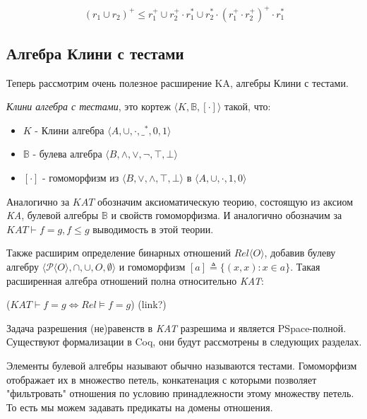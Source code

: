 \documentclass[times
              ]{itmo-student-thesis}
\begin{document}
      $$ (r_1 \cup r_2)^+ \leq r_1^+ \cup r_2^+ \cdot r_1^* \cup r_2^* \cdot (r_1^+ \cdot r_2^+)^+ \cdot r_1^* $$

    \subsection{Алгебра Клини с тестами}
      Теперь рассмотрим очень полезное расширение KA, алгебры Клини с тестами.

      \textit{Клини алгебра с тестами}, это кортеж $\langle K,\mathbb{B}, [\cdot] \rangle$ такой, что:

      \begin{itemize}
        \item $K$ - Клини алгебра $\langle A, \cup, \cdot, \_^*, 0, 1 \rangle $
        \item $\mathbb{B}$ - булева алгебра $\langle B, \wedge, \vee, \neg, \top, \bot \rangle $
        \item $[\cdot]$ - гомоморфизм из
          $\langle B, \vee, \wedge, \top, \bot \rangle$
        в $\langle A, \cup,     \cdot, 1,    0 \rangle$
      \end{itemize}
      Аналогично за $ \mathit{KAT} $ обозначим аксиоматическую теорию, состоящую из аксиом \textit{KA},
      булевой алгебры $ \mathbb{B}$ и свойств гомоморфизма. И аналогично обозначим за $ KAT \vdash f = g, f
      \leq g $ выводимость в этой теории.

      Также расширим определение бинарных отношений $Rel \langle O \rangle $, добавив булеву алгебру $\langle
      \mathcal{P}\langle O \rangle, \cap, \cup, O, \emptyset \rangle$ и гомоморфизм $ [a] \triangleq \{(x, x): x \in a\} $. Такая
      расширенная алгебра отношений полна относительно \textit{KAT}:

      ($\mathit{KAT} \vdash f = g \Leftrightarrow \mathit{Rel} \models f = g$) (link?)

      Задача разрешения (не)равенств в \textit{KAT} разрешима и является PSpace-полной\cite{kozen_kat}.
      Существуют формализации в Coq, они будут рассмотрены в следующих разделах. \cite{kat}

      Элементы булевой алгебры называют обычно называются тестами.
      Гомоморфизм отображает их в множество петель, конкатенация с которыми позволяет "фильтровать"
      отношения по условию принадлежности этому множеству петель.
      То есть мы можем задавать предикаты на домены отношения.
\end{document}
